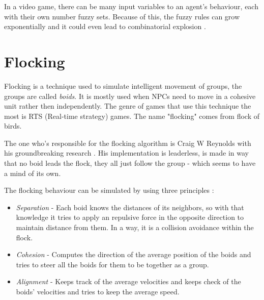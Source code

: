 \documentclass[a4paper, 12pt]{book}
\begin{document}
In a video game, there can be many input variables to an agent's behaviour, each with their own number fuzzy sets. Because of this, the fuzzy rules can grow exponentially and it could even lead to combinatorial explosion \cite{CombinatorialBombing}.

\section{Flocking}

Flocking is a technique used to simulate intelligent movement of groups, the groups are called \emph{boids}. It is mostly used when NPCs need to move in a cohesive unit rather then independently. The genre of games that use this technique the most is RTS (Real-time strategy) games. The name "flocking" comes from flock of birds.

The one who's responsible for the flocking algorithm is Craig W Reynolds with his groundbreaking research \cite{FlocksReynolds}. His implementation is leaderless, is made in way that no boid leads the flock, they all just follow the group - which seems to have a mind of its own.

The flocking behaviour can be simulated by using three principles \cite{FlockingBehaviour}: 
\begin{itemize}
    \item \emph{Separation} - Each boid knows the distances of its neighbors, so with that knowledge it tries to apply an repulsive force in the opposite direction to maintain distance from them. In a way, it is a collision avoidance within the flock.
    \item \emph{Cohesion} - Computes the direction of the average position of the boids and tries to steer all the boids for them to be together as a group.
    \item \emph{Alignment} - Keeps track of the average velocities and keeps check of the boids' velocities and tries to keep the average speed.
\end{itemize}
\end{document}
